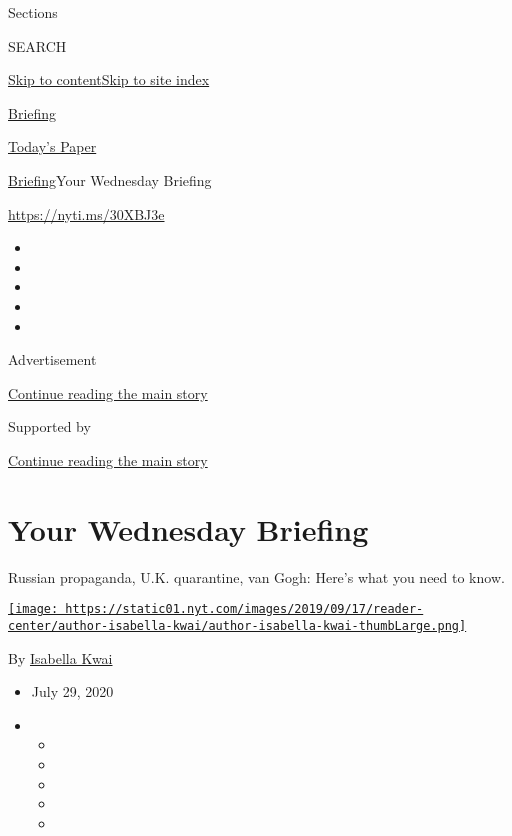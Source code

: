 Sections

SEARCH

\protect\hyperlink{site-content}{Skip to
content}\protect\hyperlink{site-index}{Skip to site index}

\href{https://www.nytimes.com/interactive/2018/briefing/global-morning-briefing-newsletter-signup.html}{Briefing}

\href{https://myaccount.nytimes.com/auth/login?response_type=cookie\&client_id=vi}{}

\href{https://www.nytimes.com/section/todayspaper}{Today's Paper}

\href{/interactive/2018/briefing/global-morning-briefing-newsletter-signup.html}{Briefing}\textbar{}Your
Wednesday Briefing

\url{https://nyti.ms/30XBJ3e}

\begin{itemize}
\item
\item
\item
\item
\item
\end{itemize}

Advertisement

\protect\hyperlink{after-top}{Continue reading the main story}

Supported by

\protect\hyperlink{after-sponsor}{Continue reading the main story}

\hypertarget{your-wednesday-briefing}{%
\section{Your Wednesday Briefing}\label{your-wednesday-briefing}}

Russian propaganda, U.K. quarantine, van Gogh: Here's what you need to
know.

\href{https://www.nytimes.com/by/isabella-kwai}{\texttt{[image: https://static01.nyt.com/images/2019/09/17/reader-center/author-isabella-kwai/author-isabella-kwai-thumbLarge.png]}}

By \href{https://www.nytimes.com/by/isabella-kwai}{Isabella Kwai}

\begin{itemize}
\item
  July 29, 2020
\item
  \begin{itemize}
  \item
  \item
  \item
  \item
  \item
  \end{itemize}
\end{itemize}

